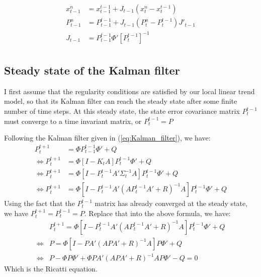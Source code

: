 \begin{equation}
\begin{split}
x^n_{t-1} &= x^{t-1}_{t-1} + J_{t-1}(x^n_t - x^{t-1}_t) \\
P^n_{t-1} &= P^{t-1}_{t-1} + J_{t-1}(P^n_t-P^{t-1}_t)J'_{t-1}\\
J_{t-1} &= P^{t-1}_{t-1}\Phi'[P^{t-1}_t]^{-1}\\
\end{split}
\end{equation}

\subsection{Steady state of the Kalman filter}
I first assume that the regularity conditions are satisfied by our local linear trend model, so that its Kalman filter can reach the steady state after some finite number of time steps. At this steady state, the state error covariance matrix $P^{t-1}_{t}$ must converge to a time invariant matrix, or $P^{t-1}_{t} = P$ 

Following the Kalman filter given in (\ref{eq:Kalman_filter}), we have:
\begin{equation}
\begin{split}
	P^{t+1}_t &= \Phi P^{t-1}_{t-1} \Phi' + Q\\
\Leftrightarrow P^{t+1}_t &= \Phi [I - K_tA]P^{t-1}_t \Phi' + Q\\
\Leftrightarrow P^{t+1}_t &= \Phi [I - P^{t-1}_tA'\Sigma_t^{-1}A]P^{t-1}_t \Phi' + Q \\
\Leftrightarrow P^{t+1}_t &= \Phi [I - P^{t-1}_tA'(AP^{t-1}_{t}A'+ R)^{-1}A]P^{t-1}_t \Phi' + Q
\end{split}
\end{equation}
Using the fact that the $P^{t-1}_t$ matrix has already converged at the steady state, we have $P^{t+1}_t = P^{t-1}_t = P$. Replace that into the above formula, we have:
\begin{equation}\label{eq:Ricatti}
\begin{split}
&P^{t+1}_t = \Phi [I - P^{t-1}_tA'(AP^{t-1}_{t}A'+ R)^{-1}A]P^{t-1}_t \Phi' + Q\\
\Leftrightarrow &P = \Phi[I - PA'(APA'+R)^{-1}A]P \Phi'+Q \\
\Leftrightarrow & P - \Phi P \Phi' +\Phi PA'(APA'+R)^{-1}AP \Phi'-Q = 0
\end{split}
\end{equation}
Which is the Ricatti equation.

